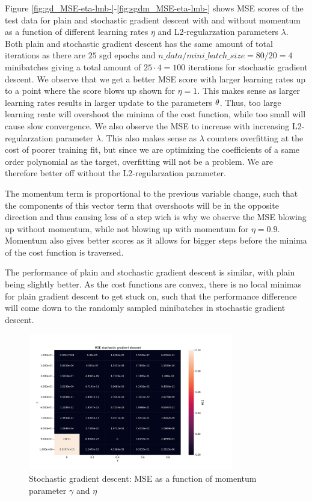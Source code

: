 Figure \ref{fig:gd_MSE-eta-lmb-}-\ref{fig:sgdm_MSE-eta-lmb-} shows MSE scores of the test data for 
plain and stochastic gradient descent with and without momentum as a function of
different learning rates \(\eta \) and L2-regularzation parameters \(\lambda \). Both plain and 
stochastic gradient descent has the same amount of total iterations as there are $25$ sgd epochs 
and $n\_data/mini\_batch\_size=80/20=4$ minibatches giving a total amount of $25 \cdot 4 = 100$ 
iterations for stochastic gradient descent. We observe that we get a better MSE score with larger 
learning rates up to a point where the score blows up shown for $\eta=1$. This makes sense as larger 
learning rates results in larger update to the parameters $\bf{\theta } $. Thus, too large learning reate 
will overshoot the minima of the cost function, while too small will cause slow convergence.  
We also observe the MSE to increase with increasing L2-regularzation parameter $\lambda $. This also 
makes sense as $\lambda $ counters overfitting at the cost of poorer training fit, but since we are 
optimizing the coefficients of a same order polynomial as the target, overfitting will not be a problem.
We are therefore better off without the L2-regularzation parameter. 

The momentum 
term is proportional to the previous variable change, such that the components of this vector term that overshoots will  
be in the opposite direction and thus causing less of a step wich is why we observe the MSE blowing up without momentum,
while not blowing up with momentum for $\eta =0.9$. Momentum also gives better scores as it allows for bigger steps
before the minima of the cost function is traversed. 

The performance of plain and stochastic gradient descent is similar, with plain being slightly better. As the 
cost functions are convex, there is no local minimas for plain gradient descent to get stuck on, such that the 
performance difference will come down to the randomly sampled minibatches in stochastic gradient descent. 



\begin{figure}[H]
\centering
\includegraphics[width=0.8\textwidth]{Figures/PartA/_sgdm_MSE(eta,momentum)}
\caption{Stochastic gradient descent: MSE as a function of momentum parameter $\gamma$  and \(\eta \)	 }
\label{fig:_sgdm_MSE-eta-momentum-}
\end{figure}

